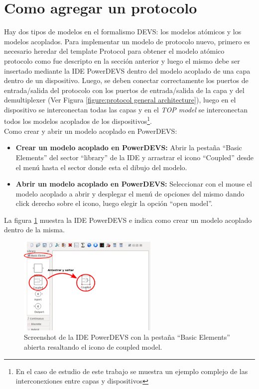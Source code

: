 \documentclass[10pt,a4paper]{article}
\begin{document}
\section{Como agregar un protocolo}

Hay dos tipos de modelos en el formalismo DEVS: los modelos atómicos y los modelos acoplados. Para implementar un modelo de protocolo nuevo, primero es necesario heredar del template Protocol para obtener el modelo atómico protocolo como fue descripto en la sección anterior y luego el mismo debe ser insertado mediante la IDE PowerDEVS dentro del modelo acoplado de una capa dentro de un dispositivo. Luego, se deben conectar correctamente los puertos de entrada/salida del protocolo con los puertos de entrada/salida de la capa y del demultiplexer (Ver Figura \ref{figure:protocol general architecture}), luego en el dispositivo se interconectan todas las capas y en el \textit{TOP model} se interconectan todos los modelos acoplados de los dispositivos\footnote{En el caso de estudio de este trabajo se muestra un ejemplo complejo de las interconexiones entre capas y dispositivos}. \\

Como crear y abrir un modelo acoplado en PowerDEVS:
\begin{itemize}
\item \textbf{Crear un modelo acoplado en PowerDEVS: } Abrir la pestaña ``Basic Elements'' del sector ``library'' de la IDE y arrastrar el icono ``Coupled'' desde el menú hasta el sector donde esta el dibujo del modelo.
\item \textbf{Abrir un modelo acoplado en PowerDEVS:} Seleccionar con el mouse el modelo acoplado a abrir y desplegar el menú de opciones del mismo dando click derecho sobre el icono, luego elegir la opción ``open model''.
\end{itemize}

La figura \ref{figure: PowerDEVS IDE} muestra la IDE PowerDEVS e indica como crear un modelo acoplado dentro de la misma. \\

\begin{figure}[htbp]
    \centering
    \includegraphics[width = 0.6\textwidth]{img/png/powerDEVS_coupled.png}
    \caption{Screenshot de la IDE PowerDEVS con la pestaña ``Basic Elements'' abierta resaltando el icono de coupled model.}
    \label{figure: PowerDEVS IDE}
\end{figure}
\end{document}
